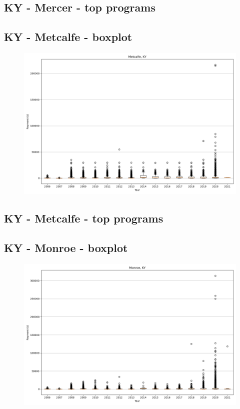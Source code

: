 \subsection*{KY - Mercer - top programs}

\newpage
\subsection*{KY - Metcalfe - boxplot}
\begin{figure}[h]
\centering
\includegraphics[width=7in]{../output/boxplots/counties/Metcalfe-KY_boxplot.png}
\end{figure}


\subsection*{KY - Metcalfe - top programs}

\newpage
\subsection*{KY - Monroe - boxplot}
\begin{figure}[h]
\centering
\includegraphics[width=7in]{../output/boxplots/counties/Monroe-KY_boxplot.png}
\end{figure}


